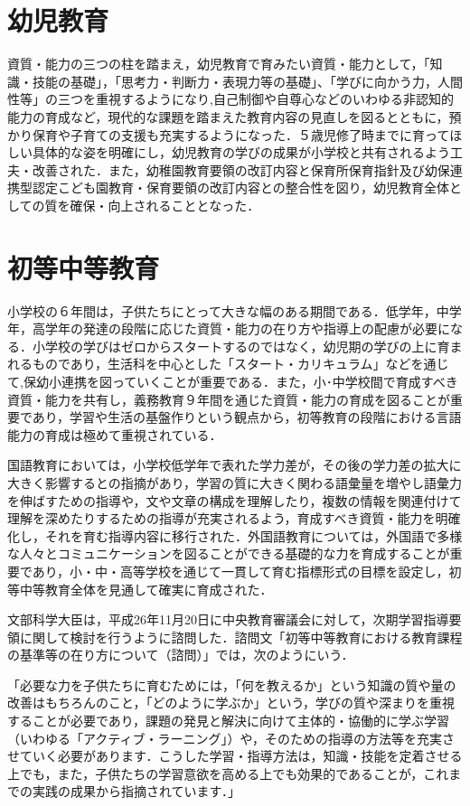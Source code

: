 \section{幼児教育}
資質・能力の三つの柱を踏まえ，幼児教育で育みたい資質・能力として，「知識・技能の基礎」，「思考力・判断力・表現力等の基礎」、「学びに向かう力，人間性等」の三つを重視するようになり,自己制御や自尊心などのいわゆる非認知的能力の育成など，現代的な課題を踏まえた教育内容の見直しを図るとともに，預かり保育や子育ての支援も充実するようになった．５歳児修了時までに育ってほしい具体的な姿を明確にし，幼児教育の学びの成果が小学校と共有されるよう工夫・改善された．また，幼稚園教育要領の改訂内容と保育所保育指針及び幼保連携型認定こども園教育・保育要領の改訂内容との整合性を図り，幼児教育全体としての質を確保・向上されることとなった．

\section{初等中等教育}

小学校の６年間は，子供たちにとって大きな幅のある期間である．低学年，中学年，高学年の発達の段階に応じた資質・能力の在り方や指導上の配慮が必要になる．小学校の学びはゼロからスタートするのではなく，幼児期の学びの上に育まれるものであり，生活科を中心とした「スタート・カリキュラム」などを通じて,保幼小連携を図っていくことが重要である．また，小･中学校間で育成すべき資質・能力を共有し，義務教育９年間を通じた資質・能力の育成を図ることが重要であり，学習や生活の基盤作りという観点から，初等教育の段階における言語能力の育成は極めて重視されている．

国語教育においては，小学校低学年で表れた学力差が，その後の学力差の拡大に大きく影響するとの指摘があり，学習の質に大きく関わる語彙量を増やし語彙力を伸ばすための指導や，文や文章の構成を理解したり，複数の情報を関連付けて理解を深めたりするための指導が充実されるよう，育成すべき資質・能力を明確化し，それを育む指導内容に移行された．外国語教育については，外国語で多様な人々とコミュニケーションを図ることができる基礎的な力を育成することが重要であり，小・中・高等学校を通じて一貫して育む指標形式の目標を設定し，初等中等教育全体を見通して確実に育成された．

文部科学大臣は，平成26年11月20日に中央教育審議会に対して，次期学習指導要領に関して検討を行うように諮問した．諮問文「初等中等教育における教育課程の基準等の在り方について（諮問）」では，次のようにいう\cite{初等中等教育における教育課程の基準等の在り方について}．

「必要な力を子供たちに育むためには，「何を教えるか」という知識の質や量の改善はもちろんのこと，「どのように学ぶか」という，学びの質や深まりを重視することが必要であり，課題の発見と解決に向けて主体的・協働的に学ぶ学習（いわゆる「アクティブ・ラーニング」）や，そのための指導の方法等を充実させていく必要があります．こうした学習・指導方法は，知識・技能を定着させる上でも，また，子供たちの学習意欲を高める上でも効果的であることが，これまでの実践の成果から指摘されています．」

